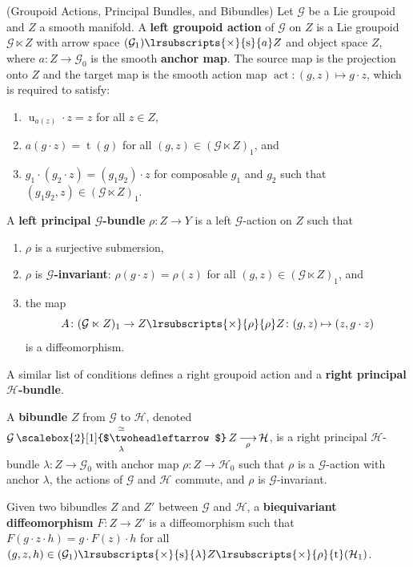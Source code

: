 \documentclass[12pt,reqno]{amsart}
\newcommand{\printname}[1]{}
\renewcommand{\printname}[1]
	{{\color{brown}{\makebox[0pt]{\hspace{-1in}\raisebox{8pt}{\tiny #1}}}}}
\newcommand{\labell}[1]{\label{#1} \printname{#1}}
\newcommand{\calG}{{\mathcal{G}}}
\newcommand{\calH}{{\mathcal{H}}}
\newcommand{\act}{{\operatorname{act}}} %
\newcommand{\src}{{\operatorname{s}}} %
\newcommand{\trg}{{\operatorname{t}}} %
\newcommand{\unit}{{\operatorname{u}}} %
\newcommand{\ftimes}[2]{{\lrsubscripts{\times}{#1}{#2}}} %
\newcommand{\ot}[1]{{\,\underset{\raisebox{1mm}{$\scriptstyle{#1}$}}{\overset{\simeq}{\scalebox{2}[1]{$\twoheadleftarrow$}}}\,}} %
\newcommand{\uto}[1]{{\,\underset{\raisebox{1mm}{$\scriptstyle{#1}$}}{\longrightarrow}\,}} %
\theoremstyle{plain}
\theoremstyle{definition}
\newenvironment{definition}
		{\pushQED{\qed}\renewcommand{\qedsymbol}{$\diamond$}\definitionx}
		{\popQED\enddefinitionx}
\begin{document}
    \begin{definition}(Groupoid Actions, Principal Bundles, and Bibundles)\labell{d:gpd-action}
        Let $\calG$ be a Lie groupoid and $Z$ a smooth manifold. A \textbf{left groupoid action} of $\calG$ on $Z$ is a Lie groupoid $\calG\ltimes Z$ with arrow space $(\calG_1)\ftimes{\src}{a}Z$ and object space $Z$, where $a\colon Z\to\calG_0$ is the smooth \textbf{anchor map}.  The source map is the projection onto $Z$ and the target map is the smooth action map $\act\colon(g,z)\mapsto g\cdot z$, which is required to satisfy:
        \begin{enumerate}
            \item $\unit_{a(z)}\cdot z=z$ for all $z\in Z$,
            \item $a(g\cdot z)=\trg(g)$ for all $(g,z)\in(\calG\ltimes Z)_1$, and
            \item $g_1\cdot(g_2\cdot z)=(g_1g_2)\cdot z$ for composable $g_1$ and $g_2$ such that $(g_1g_2,z)\in(\calG\ltimes Z)_1$.
        \end{enumerate}

        A \textbf{left principal $\calG$-bundle} $\rho\colon Z\to Y$ is a left $\calG$-action on $Z$ such that
        \begin{enumerate}
            \item $\rho$ is a surjective submersion,
            \item $\rho$ is \textbf{$\calG$-invariant}: $\rho(g\cdot z)=\rho(z)$ for all $(g,z)\in(\calG\ltimes Z)_1$, and
            \item the map $$A\colon(\calG\ltimes Z)_1\to Z\ftimes{\rho}{\rho}Z\colon(g,z)\mapsto(z,g\cdot z)$$ is a diffeomorphism.
        \end{enumerate}
A similar list of conditions defines a {right groupoid action} and a  \textbf{right principal $\calH$-bundle}. 

        A \textbf{bibundle} $Z$ from $\calG$ to $\calH$, denoted $\calG\ot{\lambda}Z\uto{\rho}\calH$, is a right principal $\calH$-bundle $\lambda\colon Z\to\calG_0$ with anchor map $\rho\colon Z\to\calH_0$ such that $\rho$ is a $\calG$-action with anchor $\lambda$, the actions of $\calG$ and $\calH$ commute, and $\rho$ is $\calG$-invariant.

        Given two bibundles $Z$ and $Z'$ between $\calG$ and $\calH$, a \textbf{biequivariant diffeomorphism} $F\colon Z\to Z'$ is a diffeomorphism such that $F(g\cdot z\cdot h)=g\cdot F(z)\cdot h$ for all $(g,z,h)\in(\calG_1)\ftimes{\src}{\lambda} Z\ftimes{\rho}{\trg}(\calH_1)$.
    \end{definition}
\end{document}
